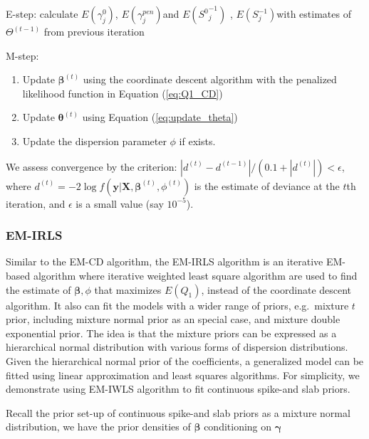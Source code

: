 \documentclass[AMA,STIX1COL,]{WileyNJD-v2}
\begin{document}
E-step: calculate \(E(\gamma^0_{j})\), \(E(\gamma^{pen}_{j})\)and
\(E({S^0}^{-1}_{j})\) , \(E({S}^{-1}_{j})\)with estimates of
\(\Theta^{(t-1)}\) from previous iteration

M-step:

\begin{enumerate}
\def\labelenumi{\alph{enumi})}
\item
  Update \(\boldsymbol{\beta}^{(t)}\) using the coordinate descent
  algorithm with the penalized likelihood function in Equation
  (\ref{eq:Q1_CD})
\item
  Update \(\boldsymbol{\theta}^{(t)}\) using Equation
  (\ref{eq:update_theta})
\item
  Update the dispersion parameter \(\phi\) if exists.
\end{enumerate}

We assess convergence by the criterion:
\(|d^{(t)}-d^{(t-1)}|/(0.1+|d^{(t)}|)<\epsilon\), where
\(d^{(t)} = -2\log f(\textbf{y}| \textbf{X}, \boldsymbol{\beta}^{(t)},\phi^{(t)})\)
is the estimate of deviance at the \(t\)th iteration, and \(\epsilon\)
is a small value (say \(10^{-5}\)).

\hypertarget{em-irls}{%
\subsubsection{EM-IRLS}\label{em-irls}}

Similar to the EM-CD algorithm, the EM-IRLS algorithm is an iterative
EM-based algorithm where iterative weighted least square algorithm are
used to find the estimate of \(\boldsymbol{\beta}, \phi\) that maximizes
\(E(Q_1)\), instead of the coordinate descent algorithm. It also can fit
the models with a wider range of priors, e.g.~mixture \(t\) prior,
including mixture normal prior as an special case, and mixture double
exponential prior. The idea is that the mixture priors can be expressed
as a hierarchical normal distribution with various forms of dispersion
distributions. \citep{Yi2012} Given the hierarchical normal prior of the
coefficients, a generalized model can be fitted using linear
approximation and least squares algorithms. For simplicity, we
demonstrate using EM-IWLS algorithm to fit continuous spike-and slab
priors.

Recall the prior set-up of continuous spike-and slab priors as a mixture
normal distribution, we have the prior densities of
\(\boldsymbol{\beta}\) conditioning on \(\boldsymbol{\gamma}\)
\end{document}
